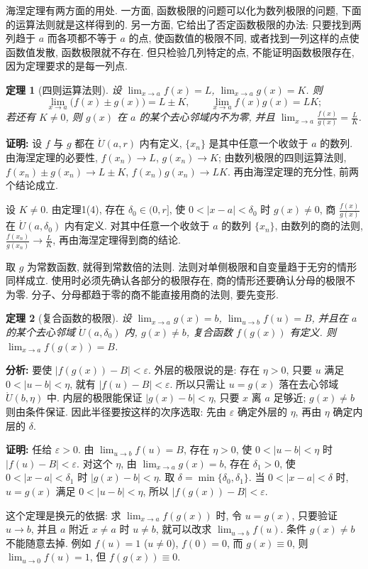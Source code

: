 \documentclass[UTF8,openany]{ctexbook}
\theoremstyle{chinesetextbook}
\newtheorem{theorem}{定理}[section]
\newenvironment{cnproof}{\par\indent\textbf{证明:} \ignorespaces}{\par}
\begin{document}
海涅定理有两方面的用处. 一方面, 函数极限的问题可以化为数列极限的问题, 下面的运算法则就是这样得到的. 另一方面, 它给出了否定函数极限的办法: 只要找到两列趋于 $a$ 而各项都不等于 $a$ 的点, 使函数值的极限不同, 或者找到一列这样的点使函数值发散, 函数极限就不存在. 但只检验几列特定的点, 不能证明函数极限存在, 因为定理要求的是每一列点.
\begin{theorem}[四则运算法则]
设 $\displaystyle\lim_{x\to a}f(x)=L$, $\displaystyle\lim_{x\to a}g(x)=K$. 则
\[
\lim_{x\to a}\bigl(f(x)\pm g(x)\bigr)=L\pm K,\qquad\lim_{x\to a}f(x)g(x)=LK;
\]
若还有 $K\ne0$, 则 $g(x)$ 在 $a$ 的某个去心邻域内不为零, 并且 $\displaystyle\lim_{x\to a}\frac{f(x)}{g(x)}=\frac LK$.
\end{theorem}
\begin{cnproof}
设 $f$ 与 $g$ 都在 $\mathring U(a,r)$ 内有定义, $\{x_n\}$ 是其中任意一个收敛于 $a$ 的数列. 由海涅定理的必要性, $f(x_n)\to L$, $g(x_n)\to K$; 由数列极限的四则运算法则, $f(x_n)\pm g(x_n)\to L\pm K$, $f(x_n)g(x_n)\to LK$. 再由海涅定理的充分性, 前两个结论成立.

设 $K\ne0$. 由定理1(4), 存在 $\delta_0\in(0,r]$, 使 $0<|x-a|<\delta_0$ 时 $g(x)\ne0$, 商 $\displaystyle\frac{f(x)}{g(x)}$ 在 $\mathring U(a,\delta_0)$ 内有定义. 对其中任意一个收敛于 $a$ 的数列 $\{x_n\}$, 由数列的商的法则, $\displaystyle\frac{f(x_n)}{g(x_n)}\to\frac LK$, 再由海涅定理得到商的结论.
\end{cnproof}
取 $g$ 为常数函数, 就得到常数倍的法则. 法则对单侧极限和自变量趋于无穷的情形同样成立. 使用时必须先确认各部分的极限存在, 商的情形还要确认分母的极限不为零. 分子、分母都趋于零的商不能直接用商的法则, 要先变形.
\begin{theorem}[复合函数的极限]
设 $\displaystyle\lim_{x\to a}g(x)=b$, $\displaystyle\lim_{u\to b}f(u)=B$, 并且在 $a$ 的某个去心邻域 $\mathring U(a,\delta_0)$ 内, $g(x)\ne b$, 复合函数 $f(g(x))$ 有定义. 则 $\displaystyle\lim_{x\to a}f(g(x))=B$.
\end{theorem}
\par\indent\textbf{分析:} 要使 $|f(g(x))-B|<\varepsilon$. 外层的极限说的是: 存在 $\eta>0$, 只要 $u$ 满足 $0<|u-b|<\eta$, 就有 $|f(u)-B|<\varepsilon$. 所以只需让 $u=g(x)$ 落在去心邻域 $\mathring U(b,\eta)$ 中. 内层的极限能保证 $|g(x)-b|<\eta$, 只要 $x$ 离 $a$ 足够近; $g(x)\ne b$ 则由条件保证. 因此半径要按这样的次序选取: 先由 $\varepsilon$ 确定外层的 $\eta$, 再由 $\eta$ 确定内层的 $\delta$.
\begin{cnproof}
任给 $\varepsilon>0$. 由 $\displaystyle\lim_{u\to b}f(u)=B$, 存在 $\eta>0$, 使 $0<|u-b|<\eta$ 时 $|f(u)-B|<\varepsilon$. 对这个 $\eta$, 由 $\displaystyle\lim_{x\to a}g(x)=b$, 存在 $\delta_1>0$, 使 $0<|x-a|<\delta_1$ 时 $|g(x)-b|<\eta$. 取 $\delta=\min\{\delta_0,\delta_1\}$. 当 $0<|x-a|<\delta$ 时, $u=g(x)$ 满足 $0<|u-b|<\eta$, 所以 $|f(g(x))-B|<\varepsilon$.
\end{cnproof}
这个定理是换元的依据: 求 $\displaystyle\lim_{x\to a}f(g(x))$ 时, 令 $u=g(x)$, 只要验证 $u\to b$, 并且 $a$ 附近 $x\ne a$ 时 $u\ne b$, 就可以改求 $\displaystyle\lim_{u\to b}f(u)$. 条件 $g(x)\ne b$ 不能随意去掉. 例如 $f(u)=1$ ($u\ne0$), $f(0)=0$, 而 $g(x)\equiv0$, 则 $\displaystyle\lim_{u\to0}f(u)=1$, 但 $f(g(x))\equiv0$.
\end{document}
